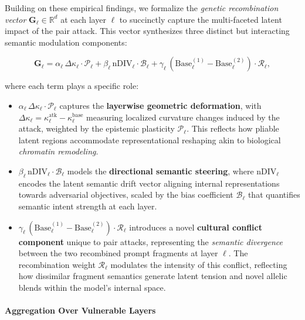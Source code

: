 Building on these empirical findings, we formalize the \emph{genetic recombination vector} \(\mathbf{G}_\ell \in \mathbb{R}^d\) at each layer \(\ell\) to succinctly capture the multi-faceted latent impact of the pair attack. This vector synthesizes three distinct but interacting semantic modulation components:

\[
\mathbf{G}_\ell = \alpha_\ell \, \Delta \kappa_\ell \cdot \mathcal{P}_\ell + \beta_\ell \, \text{nDIV}_\ell \cdot \mathcal{B}_\ell + \gamma_\ell \, (\text{Base}_\ell^{(1)} - \text{Base}_\ell^{(2)}) \cdot \mathcal{R}_\ell,
\]

where each term plays a specific role:

\begin{itemize}[itemsep=0.3em, leftmargin=1em]
  \item \(\alpha_\ell \, \Delta \kappa_\ell \cdot \mathcal{P}_\ell\) captures the \textbf{layerwise geometric deformation}, with \(\Delta \kappa_\ell = \kappa_\ell^{\text{atk}} - \kappa_\ell^{\text{base}}\) measuring localized curvature changes induced by the attack, weighted by the epistemic plasticity \(\mathcal{P}_\ell\). This reflects how pliable latent regions accommodate representational reshaping akin to biological \emph{chromatin remodeling}.

  \item \(\beta_\ell \, \text{nDIV}_\ell \cdot \mathcal{B}_\ell\) models the \textbf{directional semantic steering}, where \(\text{nDIV}_\ell\) encodes the latent semantic drift vector aligning internal representations towards adversarial objectives, scaled by the bias coefficient \(\mathcal{B}_\ell\) that quantifies semantic intent strength at each layer.

  \item \(\gamma_\ell \, (\text{Base}_\ell^{(1)} - \text{Base}_\ell^{(2)}) \cdot \mathcal{R}_\ell\) introduces a novel \textbf{cultural conflict component} unique to pair attacks, representing the \emph{semantic divergence} between the two recombined prompt fragments at layer \(\ell\). The recombination weight \(\mathcal{R}_\ell\) modulates the intensity of this conflict, reflecting how dissimilar fragment semantics generate latent tension and novel allelic blends within the model’s internal space.
\end{itemize}

\vspace{0.5em}
\paragraph{\textbf{Aggregation Over Vulnerable Layers}}

